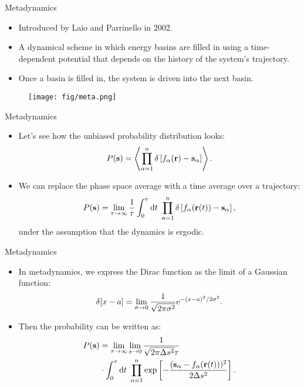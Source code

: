 \documentclass[10pt]{beamer}
\begin{document}
\begin{frame}{Metadynamics}
\begin{itemize}
\setlength\itemsep{1em}
  \item Introduced by Laio and Parrinello in 2002.
  \item A dynamical scheme in which energy basins are filled in using a time-dependent potential that depends on the history of the system's trajectory.
  \item Once a basin is filled in, the system is driven into the next basin.
\end{itemize}
\begin{figure}
  \texttt{[image: fig/meta.png]}
\end{figure}
\end{frame}

\begin{frame}{Metadynamics}
\begin{itemize}
\setlength\itemsep{1em}
  \item Let's see how the unbiased probability distribution looks:
  \begin{equation}
    P({\bf s}) = \left< \prod_{\alpha=1}^n \delta\left[ f_\alpha({\bf r}) - {\bf s}_\alpha \right] \right>.
  \end{equation}
  \item We can replace the phase space average with a time average over a trajectory:
  \begin{equation}
    P({\bf s}) = \lim_{\tau\rightarrow\infty} \frac{1}{\tau} \int_0^\tau \mathrm{d} t\; \prod_{\alpha=1}^n \delta\left[ f_\alpha({\bf r}(t)) - {\bf s}_\alpha \right],
  \end{equation}
  under the assumption that the dynamics is ergodic.
\end{itemize}
\end{frame}

\begin{frame}{Metadynamics}
\begin{itemize}
\setlength\itemsep{1em}
  \item In metadynamics, we express the Dirac function as the limit of a Gaussian function:
  \begin{equation}
    \delta[x-a] = \lim_{\sigma\rightarrow 0} \frac{1}{\sqrt{2\pi\sigma^2}} \mathrm{e}^{-(x-a)^2/2\sigma^2}.
  \end{equation}
  \item Then the probability can be written as:
  \begin{align}
    P({\bf s}) &= \lim_{\tau\rightarrow\infty}\lim_{s\rightarrow 0} \frac{1}{\sqrt{2\pi\Delta s^2}\tau} \nonumber\\
           &\cdot \int_0^\tau \mathrm{d} t\; \prod_{\alpha=1}^n \exp\left[ -\frac{({\bf s}_\alpha - f_\alpha({\bf r}(t)))^2}{2\Delta s^2} \right].
  \label{eq:metap}
  \end{align}
\end{itemize}
\end{frame}
\end{document}
